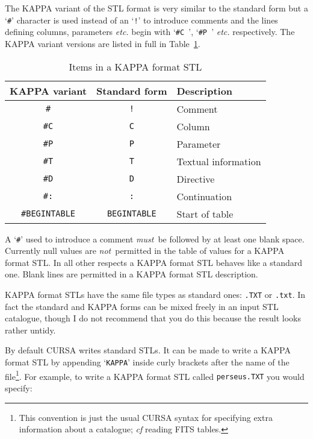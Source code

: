 \documentclass[twoside,11pt]{article}
\renewcommand{\_}{\texttt{\symbol{95}}}
\begin{document}
The KAPPA variant of the STL format is very similar to the standard
form but a `{\tt \#}' character is used instead of an `{\tt !}' to
introduce comments and the lines defining columns, parameters \emph{etc.}
begin with `{\tt \#C~}', `{\tt \#P~}' \emph{etc.} respectively.  The
KAPPA variant versions are listed in full in Table~\ref{KAP_ITEM}.

\begin{table}[htbp]

\begin{center}
\begin{tabular}{ccl}
KAPPA variant  &  Standard form & Description \\ \hline
{\tt \#}        & {\tt !}        & Comment \\
{\tt \#C}       & {\tt C}        & Column \\
{\tt \#P}       & {\tt P}        & Parameter \\
{\tt \#T}       & {\tt T}        & Textual information \\
{\tt \#D}       & {\tt D}        & Directive \\
{\tt \#:}       & {\tt :}        & Continuation \\
{\tt \#BEGINTABLE} & {\tt BEGINTABLE} & Start of table \\

\end{tabular}
\end{center}

\caption{\label{KAP_ITEM}Items in a KAPPA format STL}

\end{table}

A `{\tt \#}' used to introduce a comment {\it must}\, be followed by at
least one blank space.  Currently null values are {\it not}\, permitted
in the table of values for a KAPPA format STL.  In all other respects a
KAPPA format STL behaves like a standard one.  Blank lines are permitted
in a KAPPA format STL description.

KAPPA format STLs have the same file types as standard ones: {\tt .TXT}
or {\tt .txt}.  In fact the standard and KAPPA forms can be mixed freely
in an input STL catalogue, though I do not recommend that you do this
because the result looks rather untidy.

By default CURSA writes standard STLs.  It can be made to write a KAPPA
format STL by appending `{\tt KAPPA}' inside curly brackets after the
name of the file\footnote{This convention is just the usual CURSA 
syntax for specifying extra information about a catalogue; {\it cf}\/
reading FITS tables.}.  For example, to write a KAPPA format STL called
{\tt perseus.TXT} you would specify:
\end{document}
